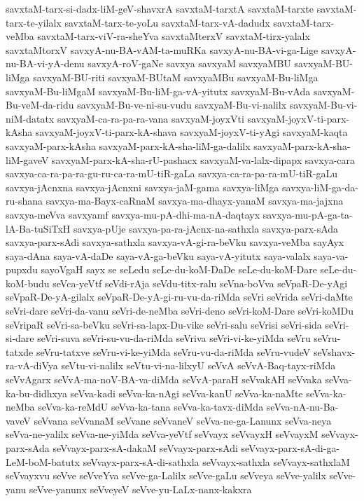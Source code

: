 {savxtaM-tarx-si-dadx-liM-geV-shavxrA
savxtaM-tarxtA
savxtaM-tarxte
savxtaM-tarx-te-yilalx
savxtaM-tarx-te-yoLu
savxtaM-tarx-vA-dadudx
savxtaM-tarx-veMba
savxtaM-tarx-viV-ra-sheYva
savxtaMterxV
savxtaM-tirx-yalalx
savxtaMtorxV
savxyA-nu-BA-vAM-ta-muRKa
savxyA-nu-BA-vi-ga-Lige
savxyA-nu-BA-vi-yA-denu
savxyA-roV-gaNe
savxya
savxyaM
savxyaMBU
savxyaM-BU-liMga
savxyaM-BU-riti
savxyaM-BUtaM
savxyaMBu
savxyaM-Bu-liMga
savxyaM-Bu-liMgaM
savxyaM-Bu-liM-ga-vA-yitutx
savxyaM-Bu-vAda
savxyaM-Bu-veM-da-ridu
savxyaM-Bu-ve-ni-su-vudu
savxyaM-Bu-vi-nalilx
savxyaM-Bu-vi-niM-datatx
savxyaM-ca-ra-pa-ra-vana
savxyaM-joyxVti
savxyaM-joyxV-ti-parx-kAsha
savxyaM-joyxV-ti-parx-kA-shava
savxyaM-joyxV-ti-yAgi
savxyaM-kaqta
savxyaM-parx-kAsha
savxyaM-parx-kA-sha-liM-ga-dalilx
savxyaM-parx-kA-sha-liM-gaveV
savxyaM-parx-kA-sha-rU-pashacx
savxyaM-va-lalx-dipapx
savxya-cara
savxya-ca-ra-pa-ra-gu-ru-ca-ra-mU-tiR-gaLa
savxya-ca-ra-pa-ra-mU-tiR-gaLu
savxya-jAcnxna
savxya-jAcnxni
savxya-jaM-gama
savxya-liMga
savxya-liM-ga-da-ru-shana
savxya-ma-Bayx-caRnaM
savxya-ma-dhayx-yanaM
savxya-ma-jajxna
savxya-meVva
savxyamf
savxya-mu-pA-dhi-ma-nA-daqtayx
savxya-mu-pA-ga-ta-lA-Ba-tuSiTxH
savxya-pUje
savxya-pa-ra-jAcnx-na-sathxla
savxya-parx-sAda
savxya-parx-sAdi
savxya-sathxla
savxya-vA-gi-ra-beVku
savxya-veMba
sayAyx
saya-dAna
saya-vA-daDe
saya-vA-ga-beVku
saya-vA-yitutx
saya-valalx
saya-va-pupxdu
sayoVgaH
sayx
se
seLedu
seLe-du-koM-DaDe
seLe-du-koM-Dare
seLe-du-koM-budu
seVca-yeVtf
seVdi-rAja
seVdu-titx-ralu
seVna-boVva
seVpaR-De-yAgi
seVpaR-De-yA-gilalx
seVpaR-De-yA-gi-ru-vu-da-riMda
seVri
seVrida
seVri-daMte
seVri-dare
seVri-da-vanu
seVri-de-neMba
seVri-deno
seVri-koM-Dare
seVri-koMDu
seVripaR
seVri-sa-beVku
seVri-sa-lapx-Du-vike
seVri-salu
seVrisi
seVri-sida
seVri-si-dare
seVri-suva
seVri-su-vu-da-riMda
seVriva
seVri-vi-ke-yiMda
seVru
seVru-tatxde
seVru-tatxve
seVru-vi-ke-yiMda
seVru-vu-da-riMda
seVru-vudeV
seVshavx-ra-vA-diVya
seVtu-vi-nalilx
seVtu-vi-na-lilxyU
seVvA
seVvA-Baq-tayx-riMda
seVvAgarx
seVvA-ma-noV-BA-va-diMda
seVvA-paraH
seVvakAH
seVvaka
seVva-ka-bu-didhxya
seVva-kadi
seVva-ka-nAgi
seVva-kanU
seVva-ka-naMte
seVva-ka-neMba
seVva-ka-reMdU
seVva-ka-tana
seVva-ka-tavx-diMda
seVva-nA-nu-Ba-vaveV
seVvana
seVvanaM
seVvane
seVvaneV
seVva-ne-ga-Lanunx
seVva-neya
seVva-ne-yalilx
seVva-ne-yiMda
seVva-yeVtf
seVvayx
seVvayxH
seVvayxM
seVvayx-parx-sAda
seVvayx-parx-sA-dakaM
seVvayx-parx-sAdi
seVvayx-parx-sA-di-ga-LeM-boM-batutx
seVvayx-parx-sA-di-sathxla
seVvayx-sathxla
seVvayx-sathxlaM
seVvayxvu
seVve
seVveYva
seVve-ga-Lalilx
seVve-gaLu
seVveya
seVve-yalilx
seVve-yanu
seVve-yanunx
seVveyeV
seVve-yu-LaLx-nanx-kakxra
}
